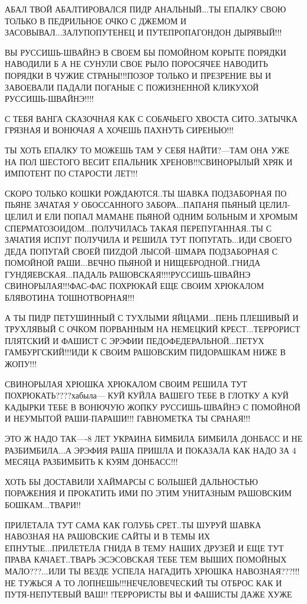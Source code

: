 АБАЛ ТВОЙ АБАЛТИРОВАЛСЯ ПИДР АНАЛЬНЫЙ...ТЫ ЕПАЛКУ СВОЮ ТОЛЬКО В ПЕДРИЛЬНОЕ ОЧКО
С ДЖЕМОМ И ЗАСОВЫВАЛ...ЗАЛУПОПУТЕНЕЦ И ПУТЕПРОПАГОНДОН ДЫРЯВЫЙ!!!      

ВЫ РУССИШЬ-ШВАЙНЭ В СВОЕМ БЫ ПОМОЙНОМ КОРЫТЕ ПОРЯДКИ НАВОДИЛИ Б А НЕ СУНУЛИ
СВОЕ РЫЛО ПОРОСЯЧЕЕ НАВОДИТЬ ПОРЯДКИ В ЧУЖИЕ СТРАНЫ!!!ПОЗОР ТОЛЬКО И ПРЕЗРЕНИЕ
ВЫ И ЗАВОЕВАЛИ ПАДАЛИ ПОГАНЫЕ С ПОЖИЗНЕННОЙ КЛИКУХОЙ  РУССИШЬ-ШВАЙНЭ!!!!    

С ТЕБЯ ВАНГА СКАЗОЧНАЯ КАК С СОБАЧЬЕГО ХВОСТА СИТО..ЗАТЫЧКА ГРЯЗНАЯ И ВОНЮЧАЯ А
ХОЧЕШЬ ПАХНУТЬ СИРЕНЬЮ!!!   

ТЫ ХОТЬ ЕПАЛКУ ТО МОЖЕШЬ ТАМ У СЕБЯ НАЙТИ?---ТАМ ОНА УЖЕ НА ПОЛ ШЕСТОГО ВЕСИТ
ЕПАЛЬНИК ХРЕНОВ!!!СВИНОРЫЛЫЙ ХРЯК И ИМПОТЕНТ ПО СТАРОСТИ ЛЕТ!!!               

СКОРО ТОЛЬКО КОШКИ РОЖДАЮТСЯ..ТЫ ШАВКА ПОДЗАБОРНАЯ ПО ПЬЯНЕ ЗАЧАТАЯ У
ОБОССАННОГО ЗАБОРА...ПАПАНЯ ПЬЯНЫЙ ЦЕЛИЛ-ЦЕЛИЛ И ЕЛИ ПОПАЛ МАМАНЕ ПЬЯНОЙ ОДНИМ
БОЛЬНЫМ И ХРОМЫМ СПЕРМАТОЗОИДОМ...ПОЛУЧИЛАСЬ ТАКАЯ ПЕРЕПУГАННАЯ..ТЫ С ЗАЧАТИЯ
ИСПУГ ПОЛУЧИЛА И РЕШИЛА ТУТ ПОПУГАТЬ...ИДИ СВОЕГО ДЕДА ПОПУГАЙ  СВОЕЙ ПИZДОЙ
ЛЫСОЙ--ШМАРА ПОДЗАБОРНАЯ С ПОМОЙНОЙ РАШИ...ВЕЧНО ПЬЯНОЙ И НИЩЕБРОДНОЙ..ГНИДА
ГУНДЯЕВСКАЯ...ПАДАЛЬ РАШОВСКАЯ!!!!РУССИШЬ-ШВАЙНЭ СВИНОРЫЛАЯ!!!ФАС-ФАС ПОХРЮКАЙ
ЕЩЕ СВОИМ ХРЮКАЛОМ БЛЯВОТИНА ТОШНОТВОРНАЯ!!!                           

А ТЫ ПИДР ПЕТУШИННЫЙ С ТУХЛЫМИ ЯЙЦАМИ...ПЕНЬ ПЛЕШИВЫЙ И ТРУХЛЯВЫЙ С ОЧКОМ
ПОРВАННЫМ НА НЕМЕЦКИЙ КРЕСТ...ТЕРРОРИСТ ПЛЯТСКИЙ И ФАШИСТ С ЭРЭФИИ
ПЕДОФЕДЕРАЛЬНОЙ...ПЕТУХ ГАМБУРГСКИЙ!!!ИДИ К СВОИМ РАШОВСКИМ ПИДОРАШКАМ НИЖЕ В
ЖОПУ!!!

СВИНОРЫЛАЯ ХРЮШКА ХРЮКАЛОМ СВОИМ РЕШИЛА ТУТ ПОХРЮКАТЬ????хабыла--- КУЙ КУЙЛА
ВАШЕГО ТЕБЕ В ГЛОТКУ А КУЙ КАДЫРКИ ТЕБЕ В ВОНЮЧУЮ ЖОПКУ РУССИШЬ-ШВАЙНЭ С
ПОМОЙНОЙ И НЕУМЫТОЙ РАШИ-ПАРАШИ!!! ГАВНОМЕТКА ТЫ СРАНАЯ!!!        

ЭТО Ж НАДО ТАК----8 ЛЕТ УКРАИНА БИМБИЛА БИМБИЛА ДОНБАСС И НЕ РАЗБИМБИЛА...А
ЭРЭФИЯ РАША ПРИШЛА И ПОКАЗАЛА КАК НАДО ЗА 4 МЕСЯЦА РАЗБИМБИТЬ К КУЯМ ДОНБАСС!!!

ХОТЬ БЫ ДОСТАВИЛИ ХАЙМАРСЫ С БОЛЬШЕЙ ДАЛЬНОСТЬЮ ПОРАЖЕНИЯ И ПРОКАТИТЬ ИМИ ПО
ЭТИМ УНИТАЗНЫМ РАШОВСКИМ БОШКАМ...ТВАРИ!!

ПРИЛЕТАЛА ТУТ САМА КАК ГОЛУБЬ СРЕТ..ТЫ ШУРУЙ ШАВКА НАВОЗНАЯ НА РАШОВСКИЕ САЙТЫ
И В ТЕМЫ ИХ ЕПНУТЫЕ...ПРИЛЕТЕЛА ГНИДА В ТЕМУ НАШИХ ДРУЗЕЙ И ЕЩЕ ТУТ ПРАВА
КАЧАЕТ..ТВАРЬ ЭСЭСОВСКАЯ ТЕБЕ ТЕМ ВЫШИХ ПОМОЙНЫХ МАЛО???...ИЛИ ТЫ ВЕЗДЕ УСПЕЛА
НАГАДИТЬ ХРЮШКА НАВОЗНАЯ???!!!НЕ ТУЖЬСЯ А ТО ЛОПНЕШЬ!!!НЕЧЕЛОВЕЧЕСКИЙ ТЫ ОТБРОС
КАК И ПУТЯ-НЕПУТЕВЫЙ ВАШ!! !ТЕРРОРИСТЫ ВЫ И ФАШИСТЫ ДАЖЕ ХУЖЕ                                             

